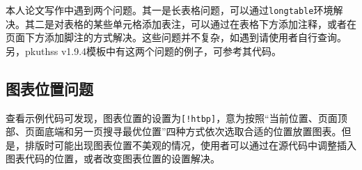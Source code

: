 本人论文写作中遇到两个问题。其一是长表格问题，可以通过\texttt{longtable}环境解决。其二是对表格的某些单元格添加表注，可以通过在表格下方添加注释，或者在页面下方添加脚注的方式解决。这些问题并不复杂，如遇到请使用者自行查询。另，pkuthss v1.9.4模板中有这两个问题的例子，可参考其代码。

\subsection{图表位置问题}

查看示例代码可发现，图表位置的设置为\texttt{[!htbp]}，意为按照“当前位置、页面顶部、页面底端和另一页搜寻最优位置”四种方式依次选取合适的位置放置图表。但是，排版时可能出现图表位置不美观的情况，使用者可以通过在源代码中调整插入图表代码的位置，或者改变图表位置的设置解决。
